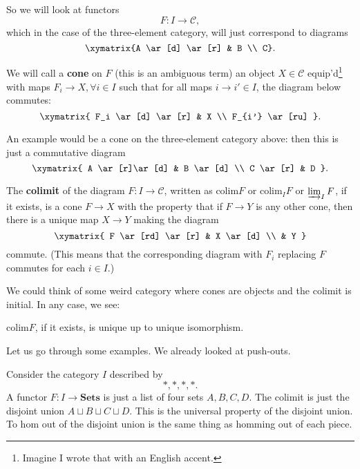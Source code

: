 So we will look at functors 
\[ F: I \to \mathcal{C},  \]
which in the case of the three-element category, will just correspond to
diagrams
\[ \xymatrix{A \ar[d]  \ar[r] &  B \\ C}.  \]

We will call a \textbf{cone} on $F$ (this is an ambiguous term) an object $X
\in \mathcal{C}$ equip'd\footnote{Imagine I wrote that with an English accent.}
with maps $F_i \to X, \forall i \in I$ such that for all maps $i \to i' \in I$,
the diagram below commutes:
\[ \xymatrix{
F_i \ar[d] \ar[r] &  X \\
F_{i'} \ar[ru]
}.\]

An example would be a cone on the three-element category above: then this is
just a commutative diagram
\[ \xymatrix{
A \ar[r]\ar[d]  &  B \ar[d]  \\
C \ar[r] &  D
}.\]

\newcommand{\colim}{\mathrm{colim}}

\begin{definition} 
The \textbf{colimit} of the diagram $F: I \to \mathcal{C}$, written as $\colim
F$ or $\colim_I F $ or $\varinjlim_I F$, if it exists, is a cone $F \to X$ with
the property that if $F \to Y$ is any other cone, then there is a unique map $X
\to Y$ making the diagram
\[ \xymatrix{
F  \ar[rd] \ar[r] &  X \ar[d]  \\
& Y
}\]
commute. (This means that the corresponding diagram with $F_i$ replacing $F$
commutes for each $i \in I$.)
\end{definition} 

We could think of some weird category where cones are objects and the colimit
is initial. In any case, we see:

\begin{proposition} 
$\colim F$, if it exists, is unique up to unique isomorphism. 
\end{proposition} 

Let us go through some examples. We already looked at push-outs. 

\begin{example} 
Consider the category $I$ described by
\[ \ast, \ast, \ast, \ast.  \]
A functor $F: I \to \mathbf{Sets}$ is just a list of four sets $A, B, C, D$. 
The colimit is just the disjoint union $A \sqcup B \sqcup C \sqcup D$. This is
the universal property of the disjoint union. To hom out of the disjoint union
is the same thing as homming out of each piece.
\end{example} 


